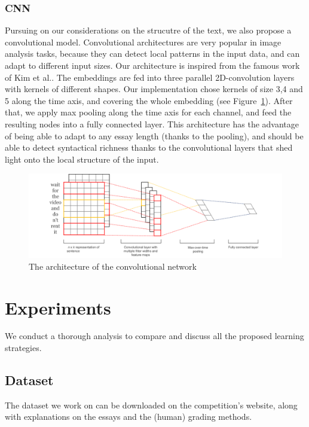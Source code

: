 \documentclass[a4paper,12pt,english]{article}
\begin{document}
\subsubsection{CNN}
Pursuing on our considerations on the strucutre of the text, we also propose a convolutional model. Convolutional architectures are very popular in image analysis tasks, because they can detect local patterns in the input data, and can adapt to different input sizes. Our architecture is inspired from the famous work of Kim et al.\cite{kim2014convolutional}. The embeddings are fed into three parallel 2D-convolution layers with kernels of different shapes. Our implementation chose kernels of size 3,4 and 5 along the time axis, and covering the whole embedding (see Figure~\ref{kim2014figure}). After that, we apply max pooling along the time axis for each channel, and feed the resulting nodes into a fully connected layer. This architecture has the advantage of being able to adapt to any essay length (thanks to the pooling), and should be able to detect syntactical richness thanks to the convolutional layers that shed light onto the local structure of the input.
\begin{figure}
	\centering
	\includegraphics[width=\textwidth]{fig/kim2014fig.png}
	\caption{The architecture of the convolutional network\cite{kim2014convolutional}}
	\label{kim2014figure}
\end{figure}

\section{Experiments}
We conduct a thorough analysis to compare and discuss all the proposed learning strategies.

\subsection{Dataset}
The dataset we work on can be downloaded on the competition's website\cite{kaggle}, along with explanations on the essays and the (human) grading methods.
\end{document}
